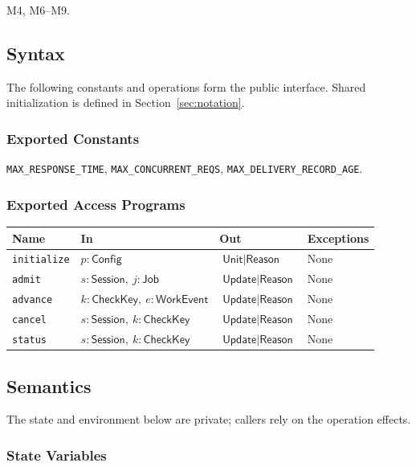 \documentclass[12pt, titlepage]{article}
\newcommand{\ty}[1]{\textsf{#1}}
\newcommand{\key}{\ty{CheckKey}}
\newcommand{\Const}[1]{\texttt{#1}}
\begin{document}
M4, M6--M9.

\subsection{Syntax}

The following constants and operations form the public interface. Shared initialization is defined in Section~\ref{sec:notation}.

\subsubsection{Exported Constants}

\Const{MAX\_\allowbreak{}RESPONSE\_\allowbreak{}TIME}, \Const{MAX\_\allowbreak{}CONCURRENT\_\allowbreak{}REQS}, \Const{MAX\_\allowbreak{}DELIVERY\_\allowbreak{}RECORD\_\allowbreak{}AGE}.

\subsubsection{Exported Access Programs}

\begin{center}
\begin{tabular}{p{3.3cm} p{4cm} p{4cm} p{2.4cm}}
\hline
\textbf{Name} & \textbf{In} & \textbf{Out} & \textbf{Exceptions} \\
\hline
\texttt{initialize} & $p:\ty{Config}$ & $\ty{Unit}\mid\ty{Reason}$ & None \\
\texttt{admit} & $s:\ty{Session},\ j:\ty{Job}$ & $\ty{Update}\mid\ty{Reason}$ & None \\
\texttt{advance} & $k:\key,\ e:\ty{WorkEvent}$ & $\ty{Update}\mid\ty{Reason}$ & None \\
\texttt{cancel} & $s:\ty{Session},\ k:\key$ & $\ty{Update}\mid\ty{Reason}$ & None \\
\texttt{status} & $s:\ty{Session},\ k:\key$ & $\ty{Update}\mid\ty{Reason}$ & None \\
\hline
\end{tabular}
\end{center}

\subsection{Semantics}

The state and environment below are private; callers rely on the operation effects.

\subsubsection{State Variables}
\end{document}
